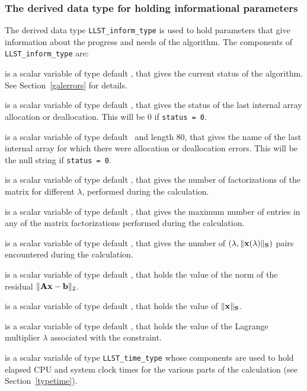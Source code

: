 \documentclass{galahad}
\newcommand{\packagename}{LLST}
\begin{document}
\subsubsection{The derived data type for holding informational
 parameters}\label{typeinform}
The derived data type 
{\tt \packagename\_inform\_type} 
is used to hold parameters that give information about the progress and needs 
of the algorithm. The components of
{\tt \packagename\_inform\_type} 
are:

\begin{description}
 is a scalar variable of type default \integer, that gives the 
current status of the algorithm. See Section~\ref{galerrors} for details. 

 is a scalar variable of type default \integer, 
that gives the status of the last internal array allocation 
or deallocation. This will be 0 if {\tt status = 0}.

 is a scalar variable of type default \character\
and length 80, that  gives the name of the last internal array 
for which there were allocation or deallocation errors.
This will be the null string if {\tt status = 0}. 

 is a scalar variable of type default \integer, that 
gives the number of factorizations of the matrix \req{kkt}
for different $\lambda$, performed during the calculation.

 is a scalar variable of type default \integer, that 
gives the maximum number of entries in any of the matrix factorizations 
performed during the calculation.

 is a scalar variable of type default \integer, that gives 
the number of $(\lambda,\|{\mathbf{x}}(\lambda)\|_{{\mathbf{S}}})$ pairs encountered during the
calculation.

 is a scalar variable of type default \realdp, that holds the
value of the norm of the residual $\| {\mathbf{A}} {\mathbf{x}} - {\mathbf{b}}\|_2$.

 is a scalar variable of type default \realdp, 
that holds the value of $\|{\mathbf{x}}\|_{{\mathbf{S}}}$.
 
 is a scalar variable of type default \realdp, that holds the 
value of the Lagrange multiplier $\lambda$ associated with the constraint. 
 
 is a scalar variable of type {\tt \packagename\_time\_type} 
whose components are used to hold elapsed CPU  and system clock times for the 
various parts of the calculation (see Section~\ref{typetime}).


\end{description}
\end{document}
